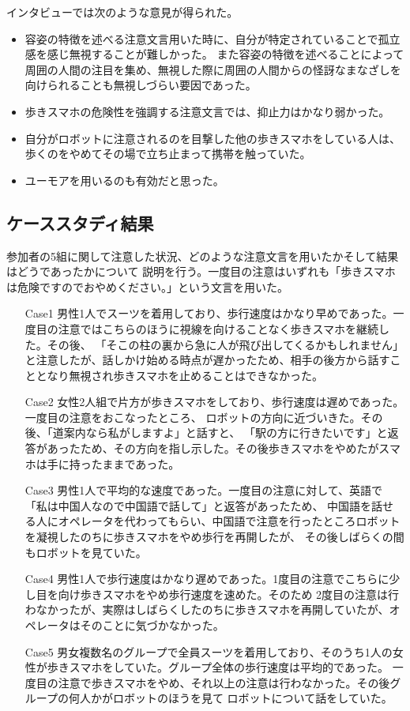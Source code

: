 \documentclass{kuisthesis}
\begin{document}
インタビューでは次のような意見が得られた。
\begin{itemize}
  \item 容姿の特徴を述べる注意文言用いた時に、自分が特定されていることで孤立感を感じ無視することが難しかった。
        また容姿の特徴を述べることによって周囲の人間の注目を集め、無視した際に周囲の人間からの怪訝なまなざしを向けられることも無視しづらい要因であった。
  \item 歩きスマホの危険性を強調する注意文言では、抑止力はかなり弱かった。
  \item 自分がロボットに注意されるのを目撃した他の歩きスマホをしている人は、歩くのをやめてその場で立ち止まって携帯を触っていた。
  \item ユーモアを用いるのも有効だと思った。
\end{itemize}
\subsection{ケーススタディ結果}
参加者の5組に関して注意した状況、どのような注意文言を用いたかそして結果はどうであったかについて
説明を行う。一度目の注意はいずれも「歩きスマホは危険ですのでおやめください。」という文言を用いた。
\begin{enumerate}
  \item[Case1] 男性1人でスーツを着用しており、歩行速度はかなり早めであった。一度目の注意ではこちらのほうに視線を向けることなく歩きスマホを継続した。その後、
  「そこの柱の裏から急に人が飛び出してくるかもしれません」
  と注意したが、話しかけ始める時点が遅かったため、相手の後方から話すこととなり無視され歩きスマホを止めることはできなかった。
  \item[Case2] 女性2人組で片方が歩きスマホをしており、歩行速度は遅めであった。一度目の注意をおこなったところ、
  ロボットの方向に近づいきた。その後、「道案内なら私がしますよ」と話すと、
  「駅の方に行きたいです」と返答があったため、その方向を指し示した。その後歩きスマホをやめたがスマホは手に持ったままであった。
  \item[Case3] 男性1人で平均的な速度であった。一度目の注意に対して、英語で「私は中国人なので中国語で話して」と返答があったため、
  中国語を話せる人にオペレータを代わってもらい、中国語で注意を行ったところロボットを凝視したのちに歩きスマホをやめ歩行を再開したが、
  その後しばらくの間もロボットを見ていた。
  \item[Case4] 男性1人で歩行速度はかなり遅めであった。1度目の注意でこちらに少し目を向け歩きスマホをやめ歩行速度を速めた。そのため
  2度目の注意は行わなかったが、実際はしばらくしたのちに歩きスマホを再開していたが、オペレータはそのことに気づかなかった。
  \item[Case5] 男女複数名のグループで全員スーツを着用しており、そのうち1人の女性が歩きスマホをしていた。グループ全体の歩行速度は平均的であった。
  一度目の注意で歩きスマホをやめ、それ以上の注意は行わなかった。その後グループの何人かがロボットのほうを見て
  ロボットについて話をしていた。
\end{enumerate}
\end{document}
